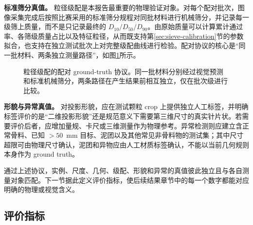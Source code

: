 \textbf{标准筛分真值。} 粒径级配是本报告最重要的物理验证对象。对每个配对批次，图像采集完成后按照比赛采用的标准筛分规程对同批材料进行机械筛分，并记录每一级筛上质量，而不是只记录最终的 $D_{10}/D_{50}/D_{90}$。由原始质量可以计算累计通过率、各筛级质量占比以及特征粒径，从而既支持第\ref{sec:sieve-calibration}节的参数拟合，也支持在独立测试批次上对完整级配曲线进行检验。配对协议的核心是“同一批材料、两条独立测量路径”，如图\ref{fig:paired-ground-truth}所示。

\begin{figure}[htbp]
\centering
{}
\caption{粒径级配的配对 ground-truth 协议。同一批材料分别经过视觉预测和标准机械筛分，两条路径在产生结果前相互独立，仅在批次级进行比较。}
\label{fig:paired-ground-truth}
\end{figure}

\textbf{形貌与异常真值。} 对投影形貌，应在测试颗粒 crop 上提供独立人工标签，并明确标签评价的是“二维投影形貌”还是规范意义下需要第三维尺寸的真实针片状。若需要评价后者，应增加量规、卡尺或三维测量作为物理参考。异常检测则应建立含正常骨料、已知 $>50$~mm 目标、泥团以及其他常见非骨料物的测试集；其中尺寸超限可由物理尺寸确认，泥团和异物应由人工材质标签确认，不能以当前几何规则本身作为 ground truth。

通过上述协议，实例、尺度、几何、级配、形貌和异常的真值彼此独立且与各自测量对象匹配。下一节据此定义评价指标，使后续结果章节中的每一个数字都能对应明确的物理或视觉含义。

\subsection{评价指标}
\label{sec:evaluation-metrics}

